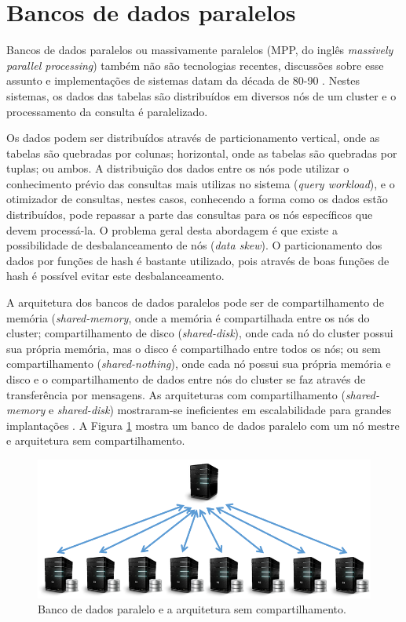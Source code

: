 \section{Bancos de dados paralelos}
\label{sec:mpp}

Bancos de dados paralelos ou massivamente paralelos (MPP, do inglês 
\emph{massively parallel processing}) também não são tecnologias 
recentes, discussões sobre esse assunto e implementações de sistemas
datam da década de 80-90 \citep{Dewitt1992, Fushimi1986}. Nestes 
sistemas, os dados das tabelas são distribuídos em diversos 
nós de um cluster e o processamento da consulta é paralelizado.

Os dados podem ser distribuídos através de particionamento vertical,
onde as tabelas são quebradas por colunas; horizontal, onde as 
tabelas são quebradas por tuplas; ou ambos. A distribuição dos 
dados entre os nós pode utilizar o conhecimento prévio
das consultas mais utilizas no sistema (\emph{query workload}),
e o otimizador de consultas, nestes casos, conhecendo a forma
como os dados estão distribuídos, pode repassar a parte das
consultas para os nós específicos que devem processá-la. O problema
geral desta abordagem é que existe a possibilidade de desbalanceamento
de nós (\emph{data skew}). O particionamento dos dados por funções de hash é 
bastante utilizado, pois através de boas funções de hash é possível
evitar este desbalanceamento.

A arquitetura dos bancos de dados paralelos pode ser de compartilhamento 
de memória (\emph{shared-memory}, onde a memória é compartilhada entre os
nós do cluster; compartilhamento de disco (\emph{shared-disk}), onde
cada nó do cluster possui sua própria memória, mas o disco é compartilhado
entre todos os nós; ou sem compartilhamento (\emph{shared-nothing}), onde
cada nó possui sua própria memória e disco e o compartilhamento de dados
entre nós do cluster se faz através de transferência por mensagens. As 
arquiteturas com compartilhamento (\emph{shared-memory} e \emph{shared-disk})
mostraram-se ineficientes em escalabilidade para grandes implantações
\citep{Dewitt1992, Stonebraker1986}. A Figura \ref{fig:mpp_arq} mostra
um banco de dados paralelo com um nó mestre e arquitetura sem 
compartilhamento.


\begin{figure}[!htbp]
        \centering
        \includegraphics[width=\linewidth]{./mpp_database.png}
        \caption{Banco de dados paralelo e a arquitetura sem compartilhamento.}
        \label{fig:mpp_arq}
\end{figure}

